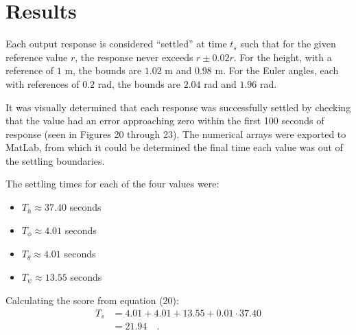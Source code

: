 \section*{Results}

Each output response is considered ``settled'' at time $t_s$ such that for the given reference value $r$, the response never exceeds $r \pm 0.02r$. For the height, with a reference of $1$ m, the bounds are $1.02$ m and $0.98$ m. For the Euler angles, each with references of $0.2$ rad, the bounds are $2.04$ rad and $1.96$ rad.

It was visually determined that each response was successfully settled by checking that the value had an error approaching zero within the first 100 seconds of response (seen in Figures 20 through 23). The numerical arrays were exported to MatLab, from which it could be determined the final time each value was out of the settling boundaries.

The settling times for each of the four values were:
\begin{itemize}
    \item $T_h \approx 37.40$ seconds
    \item $T_\phi \approx 4.01$ seconds
    \item $T_\theta \approx 4.01$ seconds
    \item $T_\psi \approx 13.55$ seconds
\end{itemize}

Calculating the score from equation (20):
\begin{align*}
    T_s &= 4.01 + 4.01 + 13.55 + 0.01 \cdot 37.40 \\
        &= \boxed{21.94} \quad .
\end{align*}